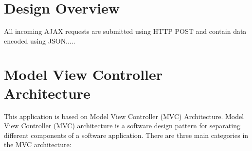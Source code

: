 
\section{Design Overview}
All incoming AJAX requests are submitted using HTTP POST and contain data encoded using JSON..... 

\section{Model View Controller Architecture}
This application is based on Model View Controller (MVC) Architecture. Model View Controller (MVC) architecture is a software design pattern for separating different components of a software application.  \cite{MVC} There are three main categories
in the MVC architecture:

